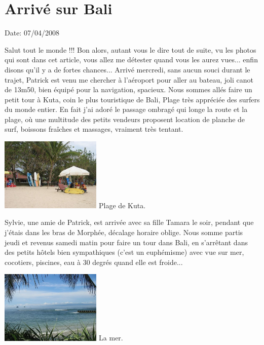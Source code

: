 \section{Arrivé sur Bali}

Date: 07/04/2008

\begin{multicols}{2}

Salut tout le monde !!! Bon alors, autant vous le dire tout de suite, vu les photos qui sont dans cet article, vous allez me détester quand vous les aurez vues... enfin disons qu'il y a de fortes chances... Arrivé mercredi, sans aucun souci durant le trajet, Patrick est venu me chercher à l'aéroport pour aller au bateau, joli canot de 13m50, bien équipé pour la navigation, spacieux. Nous sommes allés faire un petit tour à Kuta, coin le plus touristique de Bali, Plage très appréciée des surfers du monde entier. En fait j'ai adoré le passage ombragé qui longe la route et la plage, où une multitude des petits vendeurs proposent location de planche de surf, boissons fraîches et massages, vraiment très tentant.

\hspace*{-0.65cm}
\includegraphics[width=4.8cm]{articles/Arrivee-sur-bali/1207567562ikVd.jpg}
Plage de Kuta.

Sylvie, une amie de Patrick, est arrivée avec sa fille Tamara le soir, pendant que j'étais dans les bras de Morphée, décalage horaire oblige. Nous somme partis jeudi et revenus samedi matin pour faire un tour dans Bali, en s'arrêtant dans des petits hôtels bien sympathiques (c'est un euphémisme) avec vue sur mer, cocotiers, piscines, eau à 30 degrés quand elle est froide...

\hspace*{-0.65cm}
\includegraphics[width=4.8cm]{articles/Arrivee-sur-bali/1207567561DqJk.jpg}
La mer.


\end{multicols}
